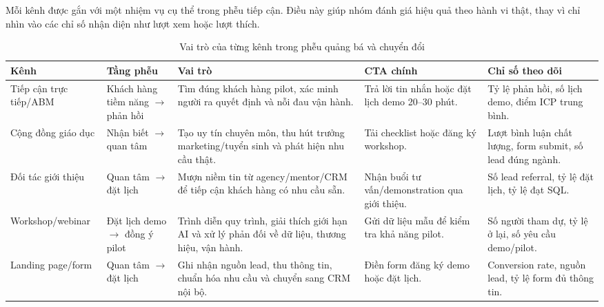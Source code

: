 Mỗi kênh được gắn với một nhiệm vụ cụ thể trong phễu tiếp cận. Điều này giúp nhóm
đánh giá hiệu quả theo hành vi thật, thay vì chỉ nhìn vào các chỉ số nhận diện
như lượt xem hoặc lượt thích.

\begin{table}[H]
    \centering
    \footnotesize
    \setlength{\tabcolsep}{3pt}
    \renewcommand{\arraystretch}{1.22}
    \caption{Vai trò của từng kênh trong phễu quảng bá và chuyển đổi}
    \label{tab:channel-funnel-role-1stream}
    \begin{tabularx}{\linewidth}{@{}L{2.9cm}L{2.1cm}Y L{2.9cm}L{3.0cm}@{}}
        \toprule
        \textbf{Kênh} &
        \textbf{Tầng phễu} &
        \textbf{Vai trò} &
        \textbf{CTA chính} &
        \textbf{Chỉ số theo dõi} \\ \midrule

        Tiếp cận trực tiếp/ABM &
        Khách hàng tiềm năng $\rightarrow$ phản hồi &
        Tìm đúng khách hàng pilot, xác minh người ra quyết định và nỗi đau vận
        hành. &
        Trả lời tin nhắn hoặc đặt lịch demo 20--30 phút. &
        Tỷ lệ phản hồi, số lịch demo, điểm ICP trung bình. \\

        Cộng đồng giáo dục &
        Nhận biết $\rightarrow$ quan tâm &
        Tạo uy tín chuyên môn, thu hút trưởng marketing/tuyển sinh và phát hiện
        nhu cầu thật. &
        Tải checklist hoặc đăng ký workshop. &
        Lượt bình luận chất lượng, form submit, số lead đúng ngành. \\

        Đối tác giới thiệu &
        Quan tâm $\rightarrow$ đặt lịch &
        Mượn niềm tin từ agency/mentor/CRM để tiếp cận khách hàng có nhu cầu sẵn. &
        Nhận buổi tư vấn/demonstration qua giới thiệu. &
        Số lead referral, tỷ lệ đặt lịch, tỷ lệ đạt SQL. \\

        Workshop/webinar &
        Đặt lịch demo $\rightarrow$ đồng ý pilot &
        Trình diễn quy trình, giải thích giới hạn AI và xử lý phản đối về dữ liệu,
        thương hiệu, vận hành. &
        Gửi dữ liệu mẫu để kiểm tra khả năng pilot. &
        Số người tham dự, tỷ lệ ở lại, số yêu cầu demo/pilot. \\

        Landing page/form &
        Quan tâm $\rightarrow$ đặt lịch &
        Ghi nhận nguồn lead, thu thông tin, chuẩn hóa nhu cầu và chuyển sang CRM
        nội bộ. &
        Điền form đăng ký demo hoặc đặt lịch. &
        Conversion rate, nguồn lead, tỷ lệ form đủ thông tin. \\


\end{tabularx}
\end{table}
